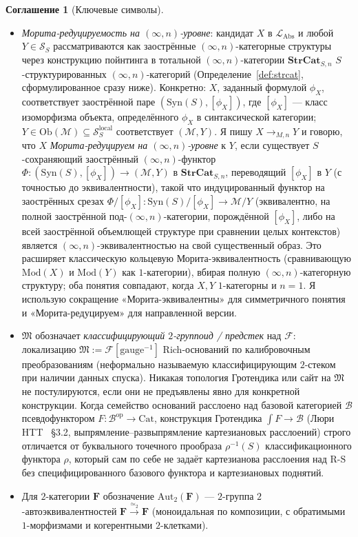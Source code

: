 \documentclass[11pt]{article}
\theoremstyle{plain}
\theoremstyle{definition}
\newtheorem{convention}[theorem]{Соглашение}
\newcommand{\RS}{\mathrm{R\text{-}S}}
\newcommand{\cS}{\mathcal{S}}
\newcommand{\cF}{\mathcal{F}}
\newcommand{\cM}{\mathcal{M}}
\newcommand{\fM}{\mathfrak{M}}
\newcommand{\LAbs}{\mathcal{L}_{\mathrm{Abs}}}
\newcommand{\Ob}{\mathrm{Ob}}
\newcommand{\Cat}{\mathrm{Cat}}
\newcommand{\Syn}{\mathrm{Syn}}
\newcommand{\Mod}{\mathrm{Mod}}
\begin{document}
\begin{convention}[Ключевые символы]
\begin{itemize}
\item \emph{Морита-редуцируемость на $(\infty, n)$-уровне}: кандидат $X$ в $\LAbs$ и любой $Y \in \cS_S$ рассматриваются как заострённые $(\infty, n)$-категорные структуры через конструкцию пойнтинга в тотальной $(\infty, n)$-категории $\mathbf{StrCat}_{S, n}$ $S$-структурированных $(\infty, n)$-категорий (Определение~\ref{def:strcat}, сформулированное сразу ниже). Конкретно: $X$, заданный формулой $\phi_X$, соответствует заострённой паре $(\Syn(S), [\phi_X])$, где $[\phi_X]$ — класс изоморфизма объекта, определённого $\phi_X$ в синтаксической категории; $Y \in \Ob(\cM) \subseteq \cS_S^{\mathrm{local}}$ соответствует $(\cM, Y)$. Я пишу $X \to_{M, n} Y$ и говорю, что $X$ \emph{Морита-редуцируем на $(\infty, n)$-уровне} к $Y$, если существует $S$-сохраняющий заострённый $(\infty, n)$-функтор $\Phi : (\Syn(S), [\phi_X]) \to (\cM, Y)$ в $\mathbf{StrCat}_{S, n}$, переводящий $[\phi_X]$ в $Y$ (с точностью до эквивалентности), такой что индуцированный функтор на заострённых срезах $\Phi/[\phi_X] : \Syn(S)/[\phi_X] \to \cM/Y$ (эквивалентно, на полной заострённой под-$(\infty, n)$-категории, порождённой $[\phi_X]$, либо на всей заострённой объемлющей структуре при сравнении целых контекстов) является $(\infty, n)$-эквивалентностью на свой существенный образ. Это расширяет классическую кольцевую Морита-эквивалентность (сравнивающую $\Mod(X)$ и $\Mod(Y)$ как $1$-категории), вбирая полную $(\infty, n)$-категорную структуру; оба понятия совпадают, когда $X, Y$ $1$-категорны и $n = 1$. Я использую сокращение «Морита-эквивалентны» для симметричного понятия и «Морита-редуцируем» для направленной версии.
\item $\fM$ обозначает \emph{классифицирующий $2$-группоид / предстек} над $\cF$: локализацию $\fM := \cF[\mathrm{gauge}^{-1}]$ Rich-оснований по калибровочным преобразованиям (неформально называемую классифицирующим $2$-стеком при наличии данных спуска). Никакая топология Гротендика или сайт на $\fM$ не постулируются, если они не предъявлены явно для конкретной конструкции. Когда семейство оснований расслоено над базовой категорией $\mathcal{B}$ псевдофунктором $F : \mathcal{B}^{\mathrm{op}} \to \Cat$, конструкция Гротендика $\int F \to \mathcal{B}$ (Люри HTT~\cite{LurieHTT} \S 3.2, выпрямление--развыпрямление картезиановых расслоений) строго отличается от буквального точечного прообраза $\rho^{-1}(S)$ классификационного функтора $\rho$, который сам по себе не задаёт картезианова расслоения над $\RS$ без специфицированного базового функтора и картезиановых поднятий.
\item Для $2$-категории $\mathbf{F}$ обозначение $\mathrm{Aut}_2(\mathbf{F})$ — $2$-группа $2$-автоэквивалентностей $\mathbf{F} \xrightarrow{\simeq_2} \mathbf{F}$ (моноидальная по композиции, с обратимыми $1$-морфизмами и когерентными $2$-клетками).

\end{itemize}
\end{convention}
\end{document}
